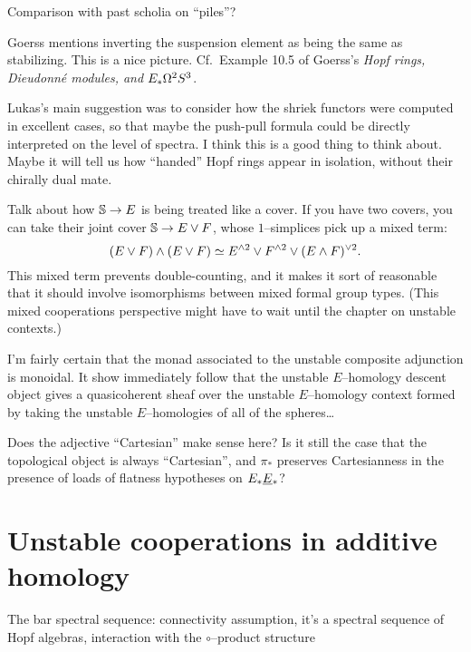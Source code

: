 Comparison with past scholia on ``piles''?


Goerss mentions inverting the suspension element as being the same as stabilizing. This is a nice picture. Cf.\ Example 10.5 of Goerss's \textit{Hopf rings, Dieudonn\'e modules, and $E_* \Loops^2 S^3$}.

Lukas's main suggestion was to consider how the shriek functors were computed in excellent cases, so that maybe the push-pull formula could be directly interpreted on the level of spectra.  I think this is a good thing to think about.  Maybe it will tell us how ``handed'' Hopf rings appear in isolation, without their chirally dual mate.

Talk about how $\S \to E$ is being treated like a cover. If you have two covers, you can take their joint cover $\S \to E \vee F$, whose $1$--simplices pick up a mixed term: \[(E \vee F) \sm (E \vee F) \simeq E^{\sm 2} \vee F^{\sm 2} \vee (E \sm F)^{\vee 2}.\]  This mixed term prevents double-counting, and it makes it sort of reasonable that it should involve isomorphisms between mixed formal group types.  (This mixed cooperations perspective might have to wait until the chapter on unstable contexts.)

I'm fairly certain that the monad associated to the unstable composite adjunction is monoidal.  It show immediately follow that the unstable $E$--homology descent object gives a quasicoherent sheaf over the unstable $E$--homology context formed by taking the unstable $E$--homologies of all of the spheres\ldots

Does the adjective ``Cartesian'' make sense here?  Is it still the case that the topological object is always ``Cartesian'', and $\pi_*$ preserves Cartesianness in the presence of loads of flatness hypotheses on $E_* \OS{E}{*}$?





\section{Unstable cooperations in additive homology}\label{UnstableSteenrodCoops}

The bar spectral sequence: connectivity assumption, it's a spectral sequence of Hopf algebras, interaction with the $\circ$--product structure


